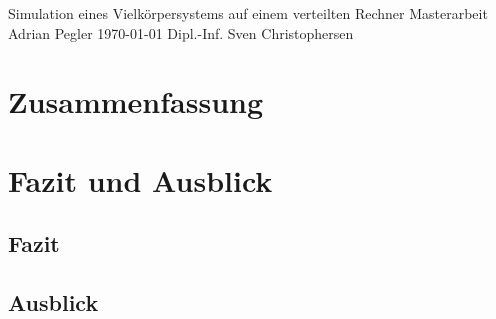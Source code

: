 \documentclass[10pt]{book}
\begin{document}
\frontmatter
  \thesistitlepage
    {Simulation eines Vielkörpersystems auf einem verteilten Rechner}
    {Masterarbeit}%
    {Adrian Pegler}%
    {\today}%
    {Dipl.-Inf. Sven Christophersen} %

  \eidesstatt{}

  \chapter*{Zusammenfassung}
    \blindtext

  \tableofcontents{}

\mainmatter













\chapter{Fazit und Ausblick}
\label{chp:Conclusions}
  \section{Fazit}
    \blindtext
  \section{Ausblick}
    \blindtext


\backmatter
  \tocbibliography
\end{document}
